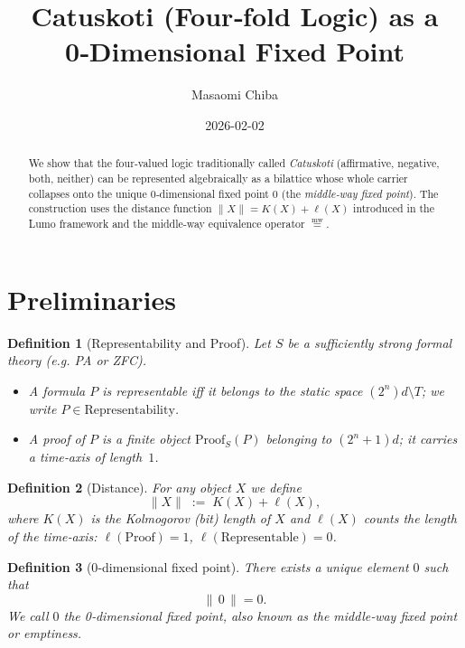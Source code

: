 \documentclass[12pt,a4paper]{article}
\newcommand{\dfix}{\mathfrak{0}}          %
\newcommand{\mw}{\mathrel{\overset{\mathrm{mw}}{=}}} %
\newtheorem{definition}{Definition}[section]
\begin{document}
\title{Catuskoti (Four‑fold Logic) as a 0‑Dimensional Fixed Point}
\author{Masaomi Chiba}
\date{2026-02-02}
\maketitle

\begin{abstract}
We show that the four‑valued logic traditionally called \emph{Catuskoti}
(affirmative, negative, both, neither) can be represented algebraically as a
bilattice whose whole carrier collapses onto the unique
0‑dimensional fixed point $\dfix$ (the \emph{middle‑way fixed point}).
The construction uses the distance function
$\|X\|=K(X)+\ell(X)$ introduced in the Lumo framework and the
middle‑way equivalence operator $\mw$.
\end{abstract}

\section{Preliminaries}

\begin{definition}[Representability and Proof]
Let $S$ be a sufficiently strong formal theory (e.g. PA or ZFC).
\begin{itemize}
  \item A formula $P$ is \emph{representable} iff it belongs to the
        static space $(2^{n})d\!\setminus\!T$; we write
        $P\in\text{Representability}$.
  \item A \emph{proof} of $P$ is a finite object
        $\text{Proof}_{S}(P)$ belonging to $(2^{n}+1)d$; it carries a
        time‑axis of length~$1$.
\end{itemize}
\end{definition}

\begin{definition}[Distance]
For any object $X$ we define
$$
\|X\|\;:=\;K(X)+\ell(X),
$$
where $K(X)$ is the Kolmogorov (bit) length of $X$ and
$\ell(X)$ counts the length of the time‑axis:
$\ell(\text{Proof})=1$, $\ell(\text{Representable})=0$.
\end{definition}

\begin{definition}[0‑dimensional fixed point]
There exists a unique element $\dfix$ such that
$$
\|\,\dfix\,\|=0 .
$$
We call $\dfix$ the \emph{0‑dimensional fixed point},
also known as the \emph{middle‑way fixed point} or \emph{emptiness}.
\end{definition}
\end{document}
